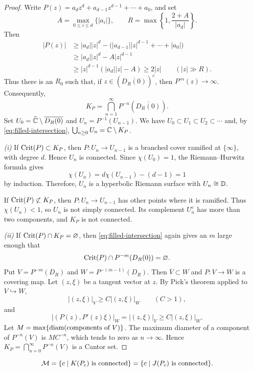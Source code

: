 \documentclass[11pt,a4paper]{article}
\begin{document}
\begin{proof}
Write $P(z)=a_dz^d+a_{d-1}z^{d-1}+\cdots+a_0$, and set
\[
A=\max_{0\le i\le d}\{|a_i|\},
\qquad R=\max\left\{1,\frac{2+A}{|a_d|}\right\}.
\]
Then
\[
\begin{aligned}
|P(z)|&\ge |a_d||z|^d-\bigl(|a_{d-1}||z|^{d-1}+\cdots+|a_0|\bigr)\\
 &\ge |a_d||z|^d-A|z|^{d-1}\\
 &\ge |z|^{d-1}(|a_d||z|-A)\ge2|z|
 \qquad (|z|\gg R).
\end{aligned}
\]
Thus there is an $R_0$ such that, if $z\in(\overline{D_R(0)})^c$, then $P^{\circ n}(z)\to\infty$. Consequently,
\begin{equation}\label{eq:filled-intersection}
K_P=\bigcap_{n=1}^{\infty}P^{-n}(\overline{D_R(0)}).
\tag{$*$}
\end{equation}
Set $U_0=\widehat{\mathbb C}\setminus\overline{D_R(0)}$ and $U_n=P^{-1}(U_{n-1})$. We have $U_0\subset U_1\subset U_2\subset\cdots$ and, by \eqref{eq:filled-intersection}, $\bigcup_{n\ge0}U_n=\mathbb{C}\setminus K_P$.

\textit{(i)} If $\operatorname{Crit}(P)\subset K_P$, then $P\colon U_n\to U_{n-1}$ is a branched cover ramified at $\{\infty\}$, with degree $d$. Hence $U_n$ is connected. Since $\chi(U_0)=1$, the Riemann--Hurwitz formula gives
\[
\chi(U_n)=d\chi(U_{n-1})-(d-1)=1
\]
by induction. Therefore, $U_n$ is a hyperbolic Riemann surface with $U_n\cong\mathbb{D}$.

If $\operatorname{Crit}(P)\not\subset K_P$, then $P\colon U_n\to U_{n-1}$ has other points where it is ramified. Thus $\chi(U_n)<1$, so $U_n$ is not simply connected. Its complement $U_n^c$ has more than two components, and $K_P$ is not connected.

\textit{(ii)} If $\operatorname{Crit}(P)\cap K_P=\varnothing$, then \eqref{eq:filled-intersection} again gives an $m$ large enough that
\[
\operatorname{Crit}(P)\cap P^{-m}(D_R(0))=\varnothing.
\]
Put $V=P^{-m}(D_R)$ and $W=P^{-(m-1)}(D_R)$. Then $\overline V\subset W$ and $P\colon V\to W$ is a covering map. Let $(z,\xi)$ be a tangent vector at $z$. By Pick's theorem applied to $V\hookrightarrow W$,
\[
|(z,\xi)|_V\ge C|(z,\xi)|_W\qquad(C>1),
\]
and
\[
|(P(z),P'(z)\xi)|_W=|(z,\xi)|_V\ge C|(z,\xi)|_W.
\]
Let $M=\max\{\operatorname{diam}(\text{components of }V)\}$. The maximum diameter of a component of $P^{-n}(V)$ is $MC^{-n}$, which tends to zero as $n\to\infty$. Hence $K_P=\bigcap_{n=0}^{\infty}P^{-n}(V)$ is a Cantor set.
\end{proof}

\setcounter{theorem}{1}\begin{corollary}
\[
\mathcal M=\{c\mid K(P_c)\text{ is connected}\}
    =\{c\mid J(P_c)\text{ is connected}\}.
\]
\end{corollary}
\end{document}
